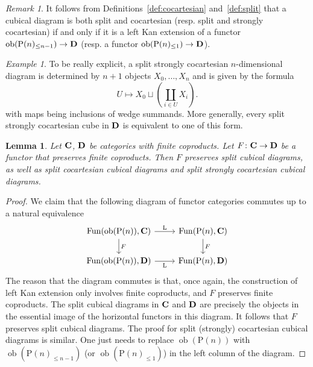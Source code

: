 \documentclass[psamsfonts]{amsart}
\theoremstyle{plain}
\newtheorem{lem}[thm]{Lemma}
\theoremstyle{definition}
\theoremstyle{remark}
\newtheorem{exmp}[thm]{Example}
\newtheorem{rem}[thm]{Remark}
\newcommand{\catname}[1]{{\normalfont\textbf{#1}}}
\newcommand{\ob}{\operatorname{ob}}
\newcommand{\lkan}{\mathrm{L}}
\newcommand{\power}{\mathrm{P}}
\DeclareMathOperator{\fun}{Fun}
\begin{document}
\begin{rem} \label{rem:split}
It follows from Definitions~\ref{def:cocartesian} and~\ref{def:split} that a cubical diagram is both split and cocartesian (resp. split and strongly cocartesian) if and only if it is a left Kan extension of a functor $\ob(\power(n)_{\le n-1})\to \catname{D}$ (resp. a functor $\ob(\power(n)_{\le 1})\to \catname{D}$). 
\end{rem}
\begin{exmp}\label{example:splitstrong}
To be really explicit, a split strongly cocartesian $n$-dimensional diagram is determined by $n+1$ objects $X_0, \ldots, X_n$ and is given by the formula
\[
U\mapsto X_0\sqcup\left(\coprod_{i\in U} X_i\right).
\]
with maps being inclusions of wedge summands. More generally, every split strongly cocartesian cube in $\catname{D}$ is equivalent to one of this form.
\end{exmp}
\begin{lem}\label{lemma:additive preserves split}
Let $\catname{C}$, $\catname{D}$ be categories with finite coproducts. Let $F\colon \catname{C}\to \catname{D}$ be a functor that preserves finite coproducts. Then $F$ preserves split cubical diagrams, as well as split cocartesian cubical diagrams and split strongly cocartesian cubical diagrams.
\end{lem}
\begin{proof}
We claim that the following diagram of functor categories commutes up to a natural equivalence
\begin{equation}\label{eq:general square of cubes}
\begin{tikzcd}
	{\fun(\ob(\power(n)), \catname{C})} & {\fun(\power(n), \catname{C})} \\
	{\fun(\ob(\power(n)), \catname{D})} & {\fun(\power(n), \catname{D})}
	\arrow["\lkan", from=1-1, to=1-2]
	\arrow["F", from=1-1, to=2-1]
	\arrow["F", from=1-2, to=2-2]
	\arrow["\lkan"', from=2-1, to=2-2]
\end{tikzcd}
\end{equation}
The reason that the diagram commutes is that, once again, the construction of left Kan extension only involves finite coproducts, and $F$ preserves finite coproducts. The split cubical diagrams in $\catname{C}$ and $\catname{D}$ are precisely the objects in the essential image of the horizontal functors in this diagram. It follows that $F$ preserves split cubical diagrams. The proof for split (strongly) cocartesian cubical diagrams is similar. One just needs to replace $\ob(\power(n))$ with $\ob(\power(n)_{\le n-1})$ (or $\ob(\power(n)_{\le 1})$) in the left column of the diagram.
\end{proof}
\end{document}
